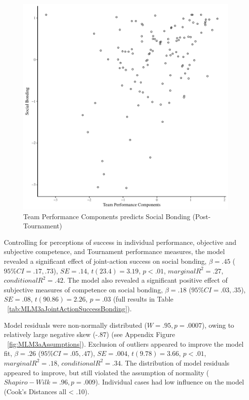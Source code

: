 \begin{CJK}{UTF8}{gbsn}
\begin{figure}[htbp]
  \centering
\includegraphics[scale=.5]{images/jasBondBasicXY.pdf}
  \caption{Team Performance Components predicts Social Bonding (Post-Tournament)}
  \label{fig:jasBondBasicXY}
\end{figure}

Controlling for perceptions of success in individual performance, objective and subjective competence, and Tournament performance measures, the model revealed a significant effect of joint-action success on social bonding, $\beta = .45$ ($95\% CI =  .17, .73$), $SE = .14$, $t(23.4) = 3.19$, $p < .01$, $marginal R^2 = .27$, $conditional R^2 = .42$.  The model also revealed a significant positive effect of subjective measures of competence on social bonding, $\beta = .18$ ($95\% CI =  .03, .35$), $SE = .08$, $t(90.86) = 2.26$, $p = .03$ (full results in Table ~\ref{tab:MLM3aJointActionSuccessBonding}).

Model residuals were non-normally distributed ($W = .95, p = .0007$), owing to relatively large negative skew (-.87) (see Appendix Figure ~\ref{fig:MLM3aAssumptions}).
Exclusion of outliers appeared to improve the model fit, $\beta = .26$ ($95\% CI =  .05, .47$), $SE = .004$, $t(9.78) = 3.66$, $p < .01$, $marginal R^2 = .18$, $conditional R^2 = .34$.  The distribution of model residuals appeared to improve, but still violated the assumption of normality ($Shapiro-Wilk = .96, p = .009$).  Individual cases had low influence on the model (Cook's Distances all < .10).


\end{CJK}
